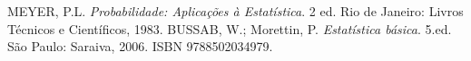 \begin{thebibliography}{2}
  MEYER, P.L. {\textit{Probabilidade: Aplicações à Estatística}}. 2 ed. Rio de Janeiro: Livros Técnicos e Científicos, 1983.
  BUSSAB, W.; Morettin, P. {\textit{Estatística básica}}. 5.ed. São Paulo: Saraiva, 2006. ISBN 9788502034979.
\end{thebibliography}
